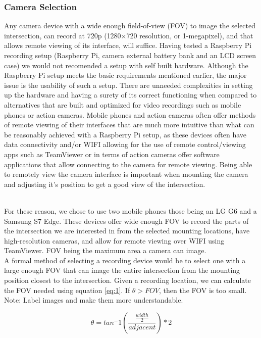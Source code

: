 \subsubsection{Camera Selection}

Any camera device with a wide enough field-of-view (FOV) to image the selected intersection, can record at 720p (1280×720 resolution, or 1-megapixel), and that allows remote viewing of its interface,
will suffice. Having tested a Raspberry Pi recording setup (Raspberry Pi, camera external battery bank and an LCD screen case) we would not recomended a setup with self built hardware.
Although the Raspberry Pi setup meets the basic requirements mentioned earlier, the major issue is the usability of such a setup. There are unneeded complexities in
setting up the hardware and having a surety of its correct functioning when compared to alternatives that are built and optimized for video recordings such as
mobile phones or action cameras. Mobile phones and action cameras often offer methods of remote viewing of their interfaces that are much more
intuitive than what can be reasonably achieved with a Raspberry Pi setup, as these devices often have data connectivity and/or WIFI allowing for the use of remote control/viewing apps such as TeamViewer or in terms of action cameras
offer software applications that allow connecting to the camera for remote viewing. Being able to remotely view the camera interface is important when mounting the
camera and adjusting it's position to get a good view of the intersection.

\ \\
For these reason, we chose to use two mobile phones those being an LG G6 and a Samsung S7 Edge.
These devices offer wide enough FOV to record the parts of the intersection we are interested in from the selected mounting locations, have high-resolution cameras, and allow for remote viewing over WIFI using TeamViewer.
FOV being the maximum area a camera can image. 
\ \\

A formal method of selecting a recording device would be to select one with a large enough FOV that can image the entire intersection from the mounting position closest to the intersection. Given a recording location, we can calculate the FOV needed using equation \ref{eq:1}.
If $\theta > FOV$, then the FOV is too small. 
\color{red}
Note: Label images and make them more understandable.
\color{black}

\begin{equation}
    \theta = tan^-1(\frac{\frac{width}{2}}{adjacent}) * 2\label{eq:1}
  \end{equation}

